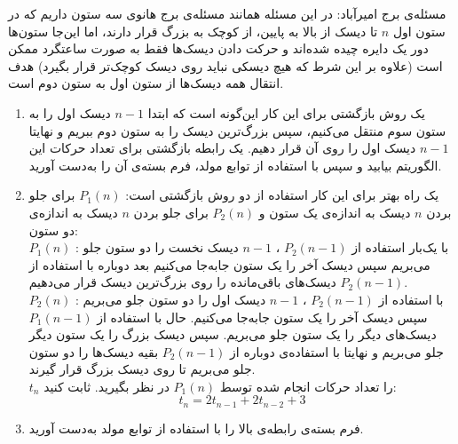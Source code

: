 \EXERCISE
مسئله‌ی برج امیرآباد: در این مسئله همانند مسئله‌ی برج هانوی سه ستون داریم که در ستون اول
$n$
تا دیسک از بالا به پایین، از کوچک به بزرگ قرار دارند، اما این‌جا ستون‌ها دور یک دایره چیده شده‌اند و حرکت دادن دیسک‌ها فقط به صورت ساعتگرد ممکن است (علاوه بر این شرط که هیچ دیسکی نباید روی دیسک کوچک‌تر قرار بگیرد) هدف انتقال همه دیسک‌ها از ستون اول به ستون دوم است.
\begin{enumerate}
\item
یک روش بازگشتی برای این کار این‌گونه است که ابتدا
$n - 1$
دیسک اول را به ستون سوم منتقل می‌کنیم، سپس بزرگ‌ترین دیسک را به ستون دوم ببریم و نهایتا
$n - 1$
دیسک اول را روی آن قرار دهیم. یک رابطه بازگشتی برای تعداد حرکات این الگوریتم بیابید و سپس با استفاده از توابع مولد، فرم بسته‌ی آن را به‌دست آورید.
\item
یک راه بهتر برای این کار استفاده از دو روش بازگشتی است:
$P_1(n)$
برای جلو بردن
$n$
دیسک به اندازه‌ی یک ستون و
$P_2(n)$
برای جلو بردن
$n$
دیسک به اندازه‌ی دو ستون:
\\
$P_1(n)$
: با یک‌بار استفاده از
$P_2(n - 1)$
،
$n - 1$
دیسک نخست را دو ستون جلو می‌بریم سپس دیسک آخر را یک ستون جابه‌جا می‌کنیم بعد دوباره با استفاده از
$P_2(n - 1)$
دیسک‌های باقی‌مانده را روی بزرگ‌ترین دیسک قرار می‌دهیم.
\\
$P_2(n)$
: با استفاده از
$P_2(n - 1)$
،
$n - 1$
دیسک اول را دو ستون جلو می‌بریم سپس دیسک آخر را یک ستون جابه‌جا می‌کنیم. حال با استفاده از
$P_1(n - 1)$
دیسک‌های دیگر را یک ستون جلو می‌بریم. سپس دیسک بزرگ را یک ستون دیگر جلو می‌بریم و نهایتا با استفاده‌ی دوباره از
$P_2(n - 1)$
بقیه دیسک‌ها را دو ستون جلو می‌بریم تا روی دیسک بزرگ قرار گیرند.
\\
$t_n$
را تعداد حرکات انجام شده توسط
$P_1(n)$
در نظر بگیرید. ثابت کنید:
$$t_n = 2t_{n-1} + 2t_{n-2} + 3$$
\item
فرم بسته‌ی رابطه‌ی بالا را با استفاده از توابع مولد به‌دست آورید.
\end{enumerate}